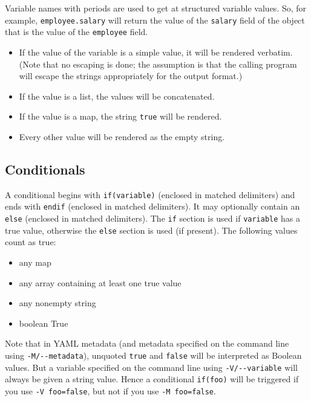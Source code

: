 \documentclass[
  b5paper
]{book}
\providecommand{\tightlist}{%
  \setlength{\itemsep}{0pt}\setlength{\parskip}{0pt}}
\begin{document}
Variable names with periods are used to get at structured variable
values. So, for example, \texttt{employee.salary} will return the value
of the \texttt{salary} field of the object that is the value of the
\texttt{employee} field.

\begin{itemize}
\tightlist
\item
  If the value of the variable is a simple value, it will be rendered
  verbatim. (Note that no escaping is done; the assumption is that the
  calling program will escape the strings appropriately for the output
  format.)
\item
  If the value is a list, the values will be concatenated.
\item
  If the value is a map, the string \texttt{true} will be rendered.
\item
  Every other value will be rendered as the empty string.
\end{itemize}

\subsection{Conditionals}\label{conditionals}

A conditional begins with \texttt{if(variable)} (enclosed in matched
delimiters) and ends with \texttt{endif} (enclosed in matched
delimiters). It may optionally contain an \texttt{else} (enclosed in
matched delimiters). The \texttt{if} section is used if
\texttt{variable} has a true value, otherwise the \texttt{else} section
is used (if present). The following values count as true:

\begin{itemize}
\tightlist
\item
  any map
\item
  any array containing at least one true value
\item
  any nonempty string
\item
  boolean True
\end{itemize}

Note that in YAML metadata (and metadata specified on the command line
using \texttt{-M/-\/-metadata}), unquoted \texttt{true} and
\texttt{false} will be interpreted as Boolean values. But a variable
specified on the command line using \texttt{-V/-\/-variable} will always
be given a string value. Hence a conditional \texttt{if(foo)} will be
triggered if you use \texttt{-V\ foo=false}, but not if you use
\texttt{-M\ foo=false}.
\end{document}
